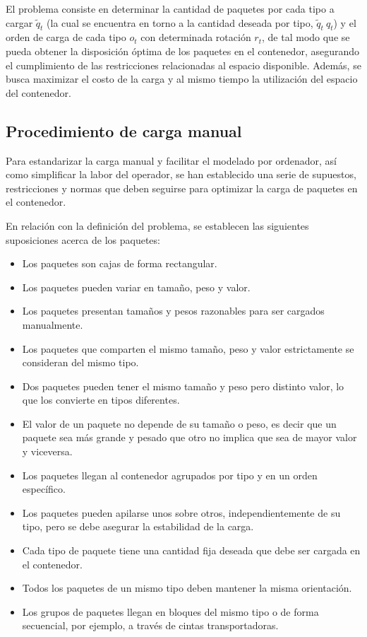 El problema consiste en determinar la cantidad de paquetes por cada tipo a cargar $\tilde{q}_t$ (la cual se encuentra en torno a la cantidad deseada por tipo, $\tilde{q}_t ~ q_t$) y el orden de carga de cada tipo $o_t$ con determinada rotación $r_t$, de tal modo que se pueda obtener la disposición óptima de los paquetes en el contenedor, asegurando el cumplimiento de las restricciones relacionadas al espacio disponible. Además, se busca maximizar el costo de la carga y al mismo tiempo la utilización del espacio del contenedor.


\subsection{Procedimiento de carga manual}

Para estandarizar la carga manual y facilitar el modelado por ordenador, así como simplificar la labor del operador, se han establecido una serie de supuestos, restricciones y normas que deben seguirse para optimizar la carga de paquetes en el contenedor.

En relación con la definición del problema, se establecen las siguientes suposiciones acerca de los paquetes:

\begin{itemize}
    \item Los paquetes son cajas de forma rectangular.
    \item Los paquetes pueden variar en tamaño, peso y valor.
    \item Los paquetes presentan tamaños y pesos razonables para ser cargados manualmente.
    \item Los paquetes que comparten el mismo tamaño, peso y valor estrictamente se consideran del mismo tipo.
    \item Dos paquetes pueden tener el mismo tamaño y peso pero distinto valor, lo que los convierte en tipos diferentes.
    \item El valor de un paquete no depende de su tamaño o peso, es decir que un paquete sea más grande y pesado que otro no implica que sea de mayor valor y viceversa.
    \item Los paquetes llegan al contenedor agrupados por tipo y en un orden específico.
    \item Los paquetes pueden apilarse unos sobre otros, independientemente de su tipo, pero se debe asegurar la estabilidad de la carga.
    \item Cada tipo de paquete tiene una cantidad fija deseada que debe ser cargada en el contenedor.
    \item Todos los paquetes de un mismo tipo deben mantener la misma orientación.
    \item Los grupos de paquetes llegan en bloques del mismo tipo o de forma secuencial, por ejemplo, a través de cintas transportadoras.
\end{itemize}

